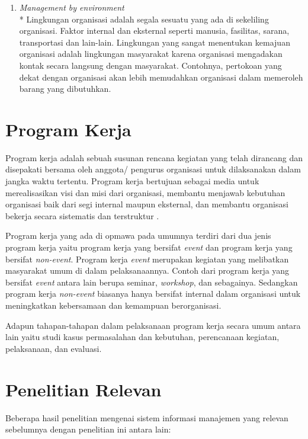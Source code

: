 \begin{enumerate}
	\item \emph{Management by environment} \\*
	Lingkungan organisasi adalah segala sesuatu yang ada di sekeliling organisasi. Faktor internal dan eksternal seperti manusia, fasilitas, sarana, transportasi dan lain-lain. Lingkungan yang sangat menentukan kemajuan organisasi adalah lingkungan masyarakat karena organisasi mengadakan kontak secara langsung dengan masyarakat. Contohnya, pertokoan yang dekat dengan organisasi akan lebih memudahkan organisasi dalam memeroleh barang yang dibutuhkan.
\end{enumerate}

\section{Program Kerja}

Program kerja adalah sebuah susunan rencana kegiatan yang telah dirancang dan disepakati bersama oleh anggota/ pengurus organisasi untuk dilaksanakan dalam jangka waktu tertentu. Program kerja bertujuan sebagai media untuk merealisasikan visi dan misi dari organisasi, membantu menjawab kebutuhan organisasi baik dari segi internal maupun eksternal, dan membantu organisasi bekerja secara sistematis dan terstruktur \cite{dosen}.

Program kerja yang ada di opmawa pada umumnya terdiri dari dua jenis program kerja yaitu program kerja yang bersifat \emph{event} dan program kerja yang bersifat \emph{non-event}. Program kerja \emph{event} merupakan kegiatan yang melibatkan masyarakat umum di dalam pelaksanaannya. Contoh dari program kerja  yang bersifat \emph{event} antara lain berupa seminar, \emph{workshop}, dan sebagainya. Sedangkan program kerja \emph{non-event} biasanya hanya bersifat internal dalam organisasi untuk meningkatkan kebersamaan dan kemampuan berorganisasi.

Adapun tahapan-tahapan dalam pelaksanaan program kerja secara umum antara lain yaitu studi kasus permasalahan dan kebutuhan, perencanaan kegiatan, pelaksanaan, dan evaluasi.

\section{Penelitian Relevan}
Beberapa hasil penelitian mengenai sistem informasi manajemen yang relevan sebelumnya dengan penelitian ini antara lain:

